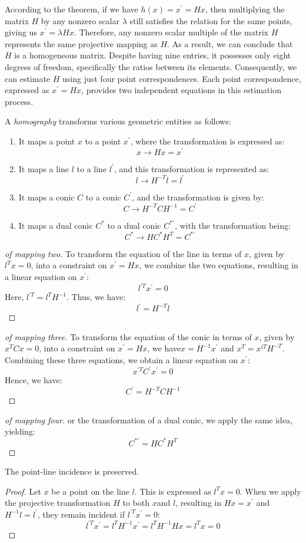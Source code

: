 According to the theorem, if we have $h(x)=x^{'}=Hx$, then multiplying the matrix $H$ by any nonzero scalar $\lambda$ still satisfies the relation for the same points, giving us $x^{'}=\lambda Hx$. 
Therefore, any nonzero scalar multiple of the matrix $H$ represents the same projective mapping as $H$.
As a result, we can conclude that $H$ is a homogeneous matrix.
Despite having nine entries, it possesses only eight degrees of freedom, specifically the ratios between its elements. 
Consequently, we can estimate $H$ using just four point correspondences.
Each point correspondence, expressed as $x^{'}=Hx$, provides two independent equations in this estimation process.
\newpage
\begin{definition}
    A \emph{homography} transforms various geometric entities as follows:
    \begin{enumerate}
        \item It maps a point $x$ to a point $x^{'}$, where the transformation is expressed as: 
            \[x \rightarrow H x=x^{'}\]
        \item It maps a line $l$ to a line $l^{'}$, and this transformation is represented as: 
            \[l \rightarrow H^{-T} l=l^{'}\]
        \item It maps a conic $C$ to a conic $C^{'}$, and the transformation is given by: 
            \[C \rightarrow H^{-T} CH^{-1}=C^{'}\]
        \item It maps a dual conic $C^{*}$ to a dual conic $C^{*'}$, with the transformation being: 
            \[C^{*} \rightarrow H C^{*}H^{T}=C^{*'}\]
    \end{enumerate}
\end{definition}
\begin{proof}[of mapping two]
    To transform the equation of the line in terms of $x$, given by $l^Tx=0$, into a constraint on $x^{'}=Hx$, we combine the two equations, resulting in a linear equation on $x^{'}$: 
    \[l^{'T}x^{'}=0\]
    Here, $l^{'T}=l^{T}H^{-1}$. 
    Thus, we have:
    \[l^{'}=H^{-T}l\]
\end{proof}
\begin{proof}[of mapping three]
    To transform the equation of the conic in terms of $x$, given by $x^{T}Cx=0$, into a constraint on $x^{'}=Hx$, we have$x=H^{-1}x^{'}$ and $x^{T}=x^{iT}H^{-T}$. 
    Combining these three equations, we obtain a linear equation on $x^{'}$: 
    \[x^{'T}C^{'}x^{'}=0\]
    Hence, we have:
    \[C^{'}=H^{-T} CH^{-1}\]
\end{proof}
\begin{proof}[of mapping four]
    or the transformation of a dual conic, we apply the same idea, yielding:
    \[C^{*'}=H C^{*}H^{T}\]
\end{proof}
The point-line incidence is preserved. 
\begin{proof}
    Let $x$ be a point on the line $l$. 
    This is expressed as $l^Tx=0$. 
    When we apply the projective transformation $H$ to both $x$and $l$, resulting in $Hx=x^{'}$ and $H^{-1}l=l^{'}$, they remain incident if $l^{'T}x^{'}=0$:
    \[l^{'T}x^{'}=l^{T}H^{-1}x^{'}=l^{T}H^{-1}Hx=l^{T}x=0\]
\end{proof}


